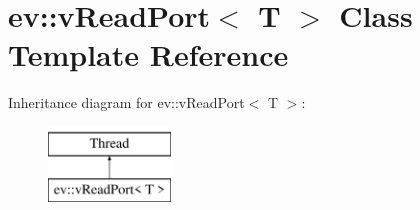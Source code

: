 \hypertarget{classev_1_1vReadPort}{}\section{ev\+:\+:v\+Read\+Port$<$ T $>$ Class Template Reference}
\label{classev_1_1vReadPort}
Inheritance diagram for ev\+:\+:v\+Read\+Port$<$ T $>$\+:\begin{figure}[H]
\begin{center}
\leavevmode
\includegraphics[height=2.000000cm]{classev_1_1vReadPort}
\end{center}
\end{figure}
